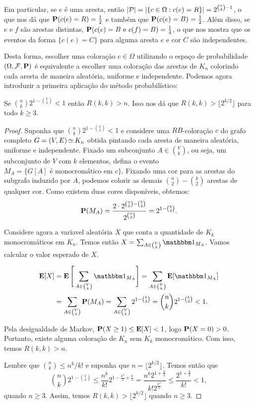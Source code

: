 Em particular, se $e$ é uma aresta, então $\left | \mathcal{P} \right | = \left | \{c \in \Omega : c(e) = R \} \right | = 2^{\binom{n}{2}-1}$, o que nos dá que $\operatorname{\mathbf{P}}(c(e) = R) = \frac{1}{2}$ e também que $\operatorname{\mathbf{P}}(c(e) = B) = \frac{1}{2}$.
Além disso, se $e$ e $f$ são arestas distintas, $\operatorname{\mathbf{P}}(c(e) = B \text{ e } c(f) = B) = \frac{1}{4}$, o que nos mostra que os eventos da forma $\{c(e) = C\}$ para alguma aresta $e$ e cor $C$ são independentes.

Desta forma, escolher uma coloração $c \in \Omega$ utilizando o espaço de probabilidade $(\Omega, \mathcal{F}, \operatorname{\mathbf{P}})$ é equivalente a escolher uma coloração das arestas de $K_n$ colorindo cada aresta de maneira aleatória, uniforme e independente. Podemos agora introduzir a primeira aplicação do método probabilístico:

\begin{theorem}[Erdös, 1947]
\label{thm:prob:method}
Se $\displaystyle \binom{n}{k} 2^{1 - \binom{k}{2}} < 1$ então $R(k,k) > n$. Isso nos dá que $R(k,k) > \lfloor 2^{k/2} \rfloor$ para todo $k \geq 3$.
\end{theorem}
\begin{proof}
Suponha que $\binom{n}{k} 2^{1 - \binom{k}{2}} < 1$ e considere uma $RB$-coloração $c$ do grafo completo $G = (V,E) \operatorname{\simeq} K_n$ obtida pintando cada aresta de maneira aleatória, uniforme e independente. Fixado um subconjunto $A \in \binom{V}{k}$, ou seja, um subconjunto de $V$ com $k$ elementos, defina o evento $M_A = \{G[A] \text{ é monocromático em } c\}$.
Fixando uma cor para as arestas do subgrafo induzido por $A$, podemos colorir as demais $\binom{n}{2} - \binom{k}{2}$ arestas de qualquer cor. Como existem duas cores disponíveis, obtemos:
\[ \operatorname{\mathbf{P}}(M_A) = \frac{2\cdot 2^{\binom{n}{2} - \binom{k}{2}}}{2^{\binom{n}{2}}}  = 2^{1 - \binom{k}{2}}. \]

Considere agora a variavel aleatória $X$ que conta a quantidade de $K_k$ monocromáticos em $K_n$. Temos então $X = \sum_{A \in \binom{V}{k}}\ind{M_A}$. Vamos calcular o valor esperado de $X$.

\begin{align*}
\expec[X] &= \expec\Bigg[\sum_{A \in \binom{V}{k}}\ind{M_A} \Bigg] = \sum_{A \in \binom{V}{k}} \expec[\ind{M_A}] \\
&= \sum_{A \in \binom{V}{k}} \prob(M_A) = \sum_{A \in \binom{V}{k}} 2^{1 - \binom{k}{2}}  = \binom{n}{k} 2^{1 - \binom{k}{2}} < 1.
\end{align*}

Pela desigualdade de Markov, $\operatorname{\mathbf{P}}(X \geq 1) \leq \operatorname{\mathbf{E}}[X] < 1$, logo $\operatorname{\mathbf{P}}(X = 0) > 0$. Portanto, existe alguma coloração de $K_n$ sem $K_k$ monocromático. Com isso, temos $R(k,k) > n$.

Lembre que $\binom{n}{k} \leq n^k /k!$ e suponha que $n = \lfloor 2^{k/2} \rfloor$. Temos então que
\[ \binom{n}{k}2^{1 - \binom{k}{2}} \leq \frac{n^k}{k!}2^{1 - \frac{k^2}{2} + \frac{k}{2}} = \frac{n^k 2^{1 + \frac{k}{2}}}{k!2^{\frac{k^2}{2}}} \leq \frac{2^{1 + \frac{k}{2}}}{k!} < 1, \]
quando $n \geq 3$. Assim, temos $R(k,k) > \lfloor 2^{k/2} \rfloor$ quando $n \geq 3$.
\end{proof}

